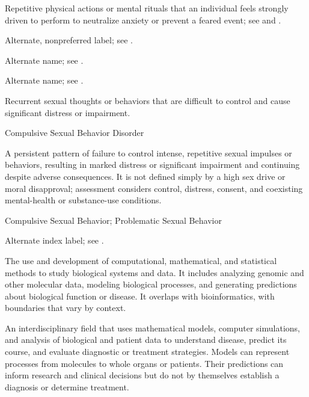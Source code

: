  Repetitive physical actions or mental rituals that an individual feels strongly driven to perform to neutralize anxiety or prevent a feared event; see  and .

 Alternate, nonpreferred label; see .

 Alternate name; see .

 Alternate name; see .

 Recurrent sexual thoughts or behaviors that are difficult to control and cause significant distress or impairment.

\synonyms
Compulsive Sexual Behavior Disorder

 A persistent pattern of failure to control intense, repetitive sexual impulses or behaviors, resulting in marked distress or significant impairment and continuing despite adverse consequences. It is not defined simply by a high sex drive or moral disapproval; assessment considers control, distress, consent, and coexisting mental-health or substance-use conditions.

\synonyms
Compulsive Sexual Behavior; Problematic Sexual Behavior

 Alternate index label; see .

 The use and development of computational, mathematical, and statistical methods to study biological systems and data. It includes analyzing genomic and other molecular data, modeling biological processes, and generating predictions about biological function or disease. It overlaps with bioinformatics, with boundaries that vary by context.

 An interdisciplinary field that uses mathematical models, computer simulations, and analysis of biological and patient data to understand disease, predict its course, and evaluate diagnostic or treatment strategies. Models can represent processes from molecules to whole organs or patients. Their predictions can inform research and clinical decisions but do not by themselves establish a diagnosis or determine treatment.

